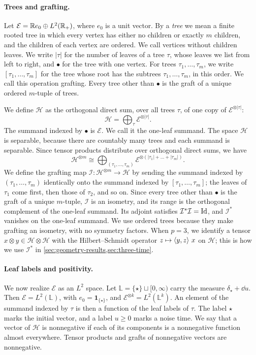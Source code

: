 \paragraph{Trees and grafting.}
Let $\mathcal E=\mathbb R e_0\oplus L^2(\mathbb R_+)$, where $e_0$ is a unit vector. By a \emph{tree} we mean a finite rooted tree in which every vertex has either no children or exactly $m$ children, and the children of each vertex are ordered. We call vertices without children leaves. We write $|\tau|$ for the number of leaves of a tree $\tau$, whose leaves we list from left to right, and $\bullet$ for the tree with one vertex. For trees $\tau_1,\dots,\tau_m$, we write $[\tau_1,\dots,\tau_m]$ for the tree whose root has the subtrees $\tau_1,\dots,\tau_m$, in this order. We call this operation grafting. Every tree other than $\bullet$ is the graft of a unique ordered $m$-tuple of trees.

We define $\mathcal H$ as the orthogonal direct sum, over all trees $\tau$, of one copy of $\mathcal E^{\otimes|\tau|}$:
\[
 \mathcal H=\bigoplus_\tau\mathcal E^{\otimes|\tau|}.
\]
The summand indexed by $\bullet$ is $\mathcal E$. We call it the one-leaf summand. The space $\mathcal H$ is separable, because there are countably many trees and each summand is separable. Since tensor products distribute over orthogonal direct sums, we have
\[
 \mathcal H^{\otimes m}\cong\bigoplus_{(\tau_1,\dots,\tau_m)}\mathcal E^{\otimes(|\tau_1|+\dots+|\tau_m|)}.
\]
We define the grafting map $\mathcal I\colon\mathcal H^{\otimes m}\to\mathcal H$ by sending the summand indexed by $(\tau_1,\dots,\tau_m)$ identically onto the summand indexed by $[\tau_1,\dots,\tau_m]$; the leaves of $\tau_1$ come first, then those of $\tau_2$, and so on. Since every tree other than $\bullet$ is the graft of a unique $m$-tuple, $\mathcal I$ is an isometry, and its range is the orthogonal complement of the one-leaf summand. Its adjoint satisfies $\mathcal I^*\mathcal I=\operatorname{Id}$, and $\mathcal I^*$ vanishes on the one-leaf summand. We use ordered trees because they make grafting an isometry, with no symmetry factors. When $p=3$, we identify a tensor $x\otimes y\in\mathcal H\otimes\mathcal H$ with the Hilbert--Schmidt operator $z\mapsto\left\langle y,z\right\rangle\,x$ on $\mathcal H$; this is how we use $\mathcal I^*$ in \cref{sec:geometry-results,sec:three-time}.

\paragraph{Leaf labels and positivity.}
We now realize $\mathcal E$ as an $L^2$ space. Let $\mathbb L=\{\star\}\sqcup[0,\infty)$ carry the measure $\delta_\star+\dd u$. Then $\mathcal E=L^2(\mathbb L)$, with $e_0=\mathbf 1_{\{\star\}}$, and $\mathcal E^{\otimes k}=L^2(\mathbb L^k)$. An element of the summand indexed by $\tau$ is then a function of the leaf labels of $\tau$. The label $\star$ marks the initial vector, and a label $u\ge0$ marks a noise time. We say that a vector of $\mathcal H$ is nonnegative if each of its components is a nonnegative function almost everywhere. Tensor products and grafts of nonnegative vectors are nonnegative.

